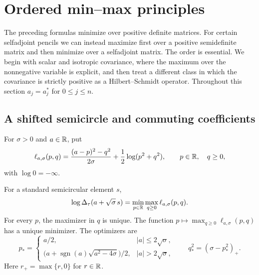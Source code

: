 \section{Ordered min--max principles}\label{sec:ordered-minmax}

The preceding formulas minimize over positive definite matrices.
For certain selfadjoint pencils we can instead maximize first over a positive semidefinite matrix and then minimize over a selfadjoint matrix.
The order is essential.
We begin with scalar and isotropic covariance, where the maximum over the nonnegative variable is explicit, and then treat a different class in which the covariance is strictly positive as a Hilbert--Schmidt operator.
Throughout this section $a_j=a_j^*$ for $0\le j\le n$.

\subsection{A shifted semicircle and commuting coefficients}

For $\sigma>0$ and $a\in\mathbb R$, put
\begin{equation}\label{eq:minmax-scalar-action}
 \ell_{a,\sigma}(p,q)
 =\frac{(a-p)^2-q^2}{2\sigma}
      +\frac12\log(p^2+q^2),
 \qquad p\in\mathbb R,\quad q\ge0,
\end{equation}
with $\log0=-\infty$.

\begin{proposition}\label{prop:minmax-scalar}
For a standard semicircular element $s$,
\begin{equation}\label{eq:minmax-scalar}
 \log\Delta_\tau(a+\sqrt\sigma\,s)
   =\min_{p\in\mathbb R}\max_{q\ge0}\ell_{a,\sigma}(p,q).
\end{equation}
For every $p$, the maximizer in $q$ is unique.
The function $p\mapsto\max_{q\ge0}\ell_{a,\sigma}(p,q)$ has a unique minimizer.
The optimizers are
\begin{equation}\label{eq:minmax-scalar-optimizer}
 p_*=
 \begin{cases}
  a/2,&|a|\le2\sqrt\sigma,\\
  \bigl(a+\operatorname{sgn}(a)\sqrt{a^2-4\sigma}\bigr)/2,
      &|a|>2\sqrt\sigma,
 \end{cases}
 \qquad q_*^2=(\sigma-p_*^2)_+.
\end{equation}
Here $r_+=\max\{r,0\}$ for $r\in\mathbb R$.
\end{proposition}

